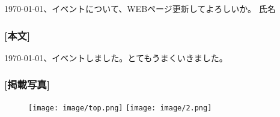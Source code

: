 \documentclass{jlreq}
\begin{document}
\ryakukianstamp

\vspace{\zw}
\today 、イベントについて、WEBページ更新してよろしいか。 氏名


\subsubsection*{[本文]}
\today、イベントしました。とてもうまくいきました。

\subsubsection*{[掲載写真]}
\begin{figure}[htbp]
	\centering
  \texttt{[image: image/top.png]}
  \texttt{[image: image/2.png]}
\end{figure}

\end{document}
